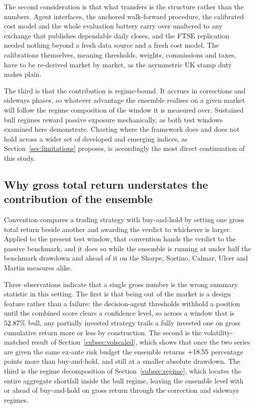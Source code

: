 The second consideration is that what transfers is the structure rather than the numbers. Agent interfaces, the anchored walk-forward procedure, the calibrated cost model and the whole evaluation battery carry over unaltered to any exchange that publishes dependable daily closes, and the FTSE replication needed nothing beyond a fresh data source and a fresh cost model. The calibrations themselves, meaning thresholds, weights, commissions and taxes, have to be re-derived market by market, as the asymmetric UK stamp duty makes plain.

The third is that the contribution is regime-bound. It accrues in corrections and sideways phases, so whatever advantage the ensemble realises on a given market will follow the regime composition of the window it is measured over. Sustained bull regimes reward passive exposure mechanically, as both test windows examined here demonstrate. Charting where the framework does and does not hold across a wider set of developed and emerging indices, as Section~\ref{sec:limitations} proposes, is accordingly the most direct continuation of this study.

\subsection{Why gross total return understates the contribution of the ensemble}\label{subsec:why_gross}

Convention compares a trading strategy with buy-and-hold by setting one gross total return beside another and awarding the verdict to whichever is larger. Applied to the present test window, that convention hands the verdict to the passive benchmark, and it does so while the ensemble is running at under half the benchmark drawdown and ahead of it on the Sharpe, Sortino, Calmar, Ulcer and Martin measures alike.

Three observations indicate that a single gross number is the wrong summary statistic in this setting. The first is that being out of the market is a design feature rather than a failure: the decision-agent thresholds withhold a position until the combined score clears a confidence level, so across a window that is $52.87\%{}$ bull, any partially invested strategy trails a fully invested one on gross cumulative return more or less by construction. The second is the volatility-matched result of Section~\ref{subsec:volscaled}, which shows that once the two series are given the same ex-ante risk budget the ensemble returns $+18.55{}$ percentage points more than buy-and-hold, and still at a smaller absolute drawdown. The third is the regime decomposition of Section~\ref{subsec:regime}, which locates the entire aggregate shortfall inside the bull regime, leaving the ensemble level with or ahead of buy-and-hold on gross return through the correction and sideways regimes.


